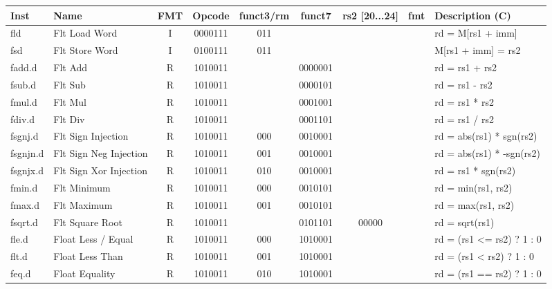\begin{center}
\begin{tabular}
{T | l | c | c | c | c | c | c | T } \hline
\rm Inst  & Name                  & FMT   & \rm Opcode & \rm funct3/rm & \rm funct7 & \rm rs2 [20...24] & \rm fmt & \rm Description (C)         \\ \hline
fld       & Flt Load Word         & I     & 0000111    & 011    &        &        & & rd = M[rs1 + imm]    \\
fsd       & Flt Store Word        & I     & 0100111    & 011    &        &        & & M[rs1 + imm] = rs2   \\
\hline
fadd.d    & Flt Add               & R     & 1010011    &        & 0000001 &        & & rd = rs1 + rs2       \\
fsub.d    & Flt Sub               & R     & 1010011    &        & 0000101 &        & & rd = rs1 - rs2       \\
fmul.d    & Flt Mul               & R     & 1010011    &        & 0001001 &        & & rd = rs1 * rs2       \\
fdiv.d    & Flt Div               & R     & 1010011    &        & 0001101 &        & & rd = rs1 / rs2       \\
fsgnj.d   & Flt Sign Injection    & R     & 1010011    & 000    & 0010001 &        & & rd = abs(rs1) * sgn(rs2) \\
fsgnjn.d  & Flt Sign Neg Injection& R     & 1010011    & 001    & 0010001 &        & & rd = abs(rs1) * -sgn(rs2) \\
fsgnjx.d  & Flt Sign Xor Injection& R     & 1010011    & 010    & 0010001 &        & & rd = rs1 * sgn(rs2)  \\
fmin.d    & Flt Minimum           & R     & 1010011    & 000    & 0010101 &        & & rd = min(rs1, rs2)   \\
fmax.d    & Flt Maximum           & R     & 1010011    & 001    & 0010101 &        & & rd = max(rs1, rs2)   \\
fsqrt.d   & Flt Square Root       & R     & 1010011    &        & 0101101 & 00000  & & rd = sqrt(rs1)       \\
\hline
fle.d     & Float Less / Equal    & R     & 1010011    & 000    & 1010001 &        & & rd = (rs1 <= rs2) ? 1 : 0\\
flt.d     & Float Less Than       & R     & 1010011    & 001    & 1010001 &        & & rd = (rs1 <  rs2) ? 1 : 0 \\
feq.d     & Float Equality        & R     & 1010011    & 010    & 1010001 &        & & rd = (rs1 == rs2) ? 1 : 0 \\

\end{tabular}
\end{center}
